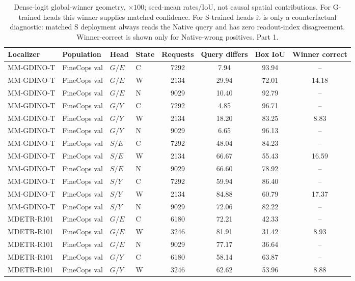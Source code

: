 \begin{table}[t]
\centering\footnotesize
\setlength{\tabcolsep}{3pt}
\renewcommand{\arraystretch}{1.15}
\caption{Dense-logit global-winner geometry, $\times100$; seed-mean rates/IoU, not causal spatial contributions. For G-trained heads this winner supplies matched confidence. For S-trained heads it is only a counterfactual diagnostic: matched S deployment always reads the Native query and has zero readout-index disagreement. Winner-correct is shown only for Native-wrong positives. Part 1.}\label{tab:supp_v6_winner_geometry_1}
\begin{tabular}{@{}llllcccc@{}}\toprule
Localizer & Population & Head & State & Requests & Query differs & Box IoU & Winner correct\\\midrule
MM-GDINO-T & FineCops val & $G/E$ & C & 7292 & 7.94 & 93.94 & --\\
MM-GDINO-T & FineCops val & $G/E$ & W & 2134 & 29.94 & 72.01 & 14.18\\
MM-GDINO-T & FineCops val & $G/E$ & N & 9029 & 10.40 & 92.79 & --\\
MM-GDINO-T & FineCops val & $G/Y$ & C & 7292 & 4.85 & 96.71 & --\\
MM-GDINO-T & FineCops val & $G/Y$ & W & 2134 & 18.20 & 83.25 & 8.83\\
MM-GDINO-T & FineCops val & $G/Y$ & N & 9029 & 6.65 & 96.13 & --\\
MM-GDINO-T & FineCops val & $S/E$ & C & 7292 & 48.04 & 84.23 & --\\
MM-GDINO-T & FineCops val & $S/E$ & W & 2134 & 66.67 & 55.43 & 16.59\\
MM-GDINO-T & FineCops val & $S/E$ & N & 9029 & 66.60 & 78.92 & --\\
MM-GDINO-T & FineCops val & $S/Y$ & C & 7292 & 59.94 & 86.40 & --\\
MM-GDINO-T & FineCops val & $S/Y$ & W & 2134 & 84.88 & 60.79 & 17.37\\
MM-GDINO-T & FineCops val & $S/Y$ & N & 9029 & 72.06 & 82.22 & --\\
MDETR-R101 & FineCops val & $G/E$ & C & 6180 & 72.21 & 42.33 & --\\
MDETR-R101 & FineCops val & $G/E$ & W & 3246 & 81.91 & 31.42 & 8.93\\
MDETR-R101 & FineCops val & $G/E$ & N & 9029 & 77.17 & 36.64 & --\\
MDETR-R101 & FineCops val & $G/Y$ & C & 6180 & 58.14 & 63.87 & --\\
MDETR-R101 & FineCops val & $G/Y$ & W & 3246 & 62.62 & 53.96 & 8.88\\

\end{tabular}
\end{table}
